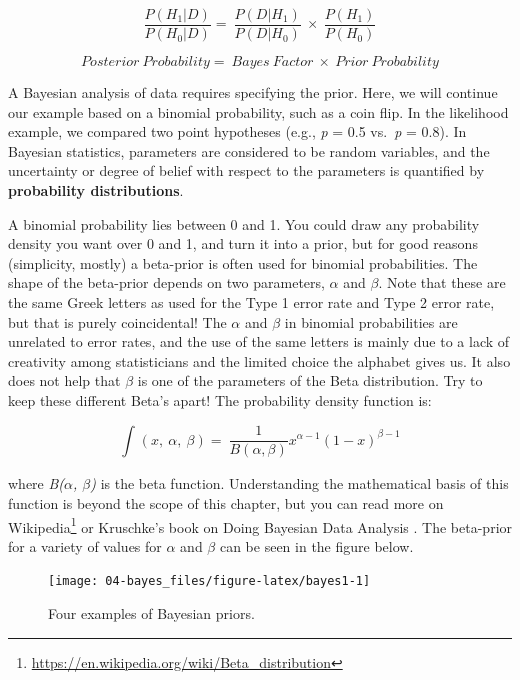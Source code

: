 \documentclass[
  oneside]{krantz}
\renewcommand{\href}[2]{#2\footnote{\url{#1}}}
\begin{document}
\[
\frac{P(H_1|D)}{P(H_0|D)} = \ \frac{P(D|H_1)}{P(D|H_0)}\  \times \ \frac{P(H_1)}{P(H_0)}
\]

\[
Posterior\ Probability = \ Bayes\ Factor\  \times \ Prior\ Probability
\]

A Bayesian analysis of data requires specifying the prior. Here, we will continue our example based on a binomial probability, such as a coin flip. In the likelihood example, we compared two point hypotheses (e.g., \emph{p} = 0.5 vs.~\emph{p} = 0.8). In Bayesian statistics, parameters are considered to be random variables, and the uncertainty or degree of belief with respect to the parameters is quantified by \textbf{probability distributions}.

A binomial probability lies between 0 and 1. You could draw any probability density you want over 0 and 1, and turn it into a prior, but for good reasons (simplicity, mostly) a beta-prior is often used for binomial probabilities. The shape of the beta-prior depends on two parameters, \(\alpha\) and \(\beta\). Note that these are the same Greek letters as used for the Type 1 error rate and Type 2 error rate, but that is purely coincidental! The \(\alpha\) and \(\beta\) in binomial probabilities are unrelated to error rates, and the use of the same letters is mainly due to a lack of creativity among statisticians and the limited choice the alphabet gives us. It also does not help that \(\beta\) is one of the parameters of the Beta distribution. Try to keep these different Beta's apart! The probability density function is:

\[
\int_{}^{}{\left( x,\ \alpha,\ \beta \right) = \ \frac{1}{B(\alpha,\beta)}}x^{\alpha - 1}{(1 - x)}^{\beta - 1}
\]

where \emph{B(\(\alpha\), \(\beta\))} is the beta function. Understanding the mathematical basis of this function is beyond the scope of this chapter, but you can read more on \href{https://en.wikipedia.org/wiki/Beta_distribution}{Wikipedia} or Kruschke's book on Doing Bayesian Data Analysis \citep{kruschke_doing_2014}. The beta-prior for a variety of values for \(\alpha\) and \(\beta\) can be seen in the figure below.



\begin{figure}

{\centering \texttt{[image: 04-bayes\_files/figure-latex/bayes1-1]} 

}

\caption{Four examples of Bayesian priors.}\label{fig:bayes1}
\end{figure}
\end{document}
